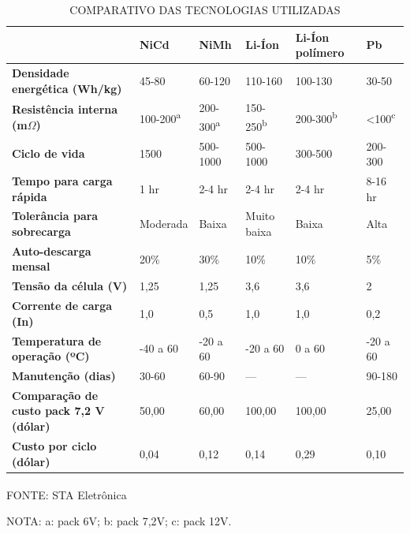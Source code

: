 \documentclass[
	12pt,				%
	openright,			%
	oneside,			%
	a4paper,			%
	english,			%
	french,				%
	spanish,			%
	brazil,				%
	oldfontcommands
	]{abntex2}
\begin{document}
	\begin{table}[th]
		\caption{COMPARATIVO DAS TECNOLOGIAS UTILIZADAS}
		\label{Tab_Bateria}
		\begin{tabular}{p{3.5cm}|p{1.6cm}|p{1.6cm}|p{1.6cm}|p{2cm}|p{1.6cm}}
	 	& \textbf{NiCd} & \textbf{NiMh} & \textbf{Li-Íon} & \textbf{Li-Íon polímero} & \textbf{Pb} \\
	 	\hline
		\textbf{Densidade energética (Wh/kg)} & 45-80 & 60-120 & 110-160 & 100-130 & 30-50 \\
	 	\hline
	 	\textbf{Resistência interna (m$\Omega$)} & 100-200\textsuperscript{a} & 200-300\textsuperscript{a} & 150-250\textsuperscript{b} & 200-300\textsuperscript{b} & <100\textsuperscript{c} \\
	 	\hline
	 	\textbf{Ciclo de vida} & 1500 & 500-1000 & 500-1000 & 300-500 & 200-300 \\
		\hline
		\textbf{Tempo para carga rápida} & 1 hr & 2-4 hr & 2-4 hr & 2-4 hr & 8-16 hr \\
		\hline
		\textbf{Tolerância para sobrecarga} & Moderada & Baixa & Muito baixa & Baixa & Alta \\
		\hline
		\textbf{Auto-descarga mensal} & 20\% & 30\% & 10\% & 10\% & 5\% \\
		\hline
		\textbf{Tensão da célula (V)} & 1,25 & 1,25 & 3,6 & 3,6 & 2 \\
		\hline
		\textbf{Corrente de carga (In)} & 1,0 & 0,5 & 1,0 & 1,0 & 0,2 \\
		\hline
		\textbf{Temperatura de operação (ºC)} & -40 a 60 & -20 a 60 & -20 a 60 & 0 a 60 & -20 a 60 \\
		\hline
		\textbf{Manutenção (dias)} & 30-60 & 60-90 & --- & --- & 90-180 \\
		\hline
		\textbf{Comparação de custo pack 7,2 V (dólar)} & 50,00 & 60,00 & 100,00 & 100,00 & 25,00 \\
		\hline
		\textbf{Custo por ciclo (dólar)} & 0,04 & 0,12 & 0,14 & 0,29 & 0,10 \\
		\hline 
		\end{tabular}
	\centering
	\begin{small}
	\vspace{3pt}
		FONTE: STA Eletrônica\textsuperscript{\cite{sta}}
	\end{small}
	
	\begin{footnotesize}
		NOTA: a: pack 6V; b: pack 7,2V; c: pack 12V.
	\end{footnotesize}
	\end{table}
\end{document}
